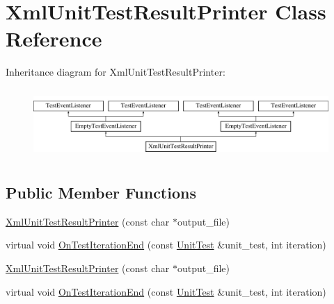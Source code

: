 \hypertarget{classtesting_1_1internal_1_1XmlUnitTestResultPrinter}{\section{\-Xml\-Unit\-Test\-Result\-Printer \-Class \-Reference}
\label{d6/de5/classtesting_1_1internal_1_1XmlUnitTestResultPrinter}
}
\-Inheritance diagram for \-Xml\-Unit\-Test\-Result\-Printer\-:\begin{figure}[H]
\begin{center}
\leavevmode
\includegraphics[height=2.675159cm]{d6/de5/classtesting_1_1internal_1_1XmlUnitTestResultPrinter}
\end{center}
\end{figure}
\subsection*{\-Public \-Member \-Functions}
\begin{DoxyCompactItemize}
\item 
\hyperlink{classtesting_1_1internal_1_1XmlUnitTestResultPrinter_a7bfec56d4e2ab7d80f3f0fde70fbf255}{\-Xml\-Unit\-Test\-Result\-Printer} (const char $\ast$output\-\_\-file)
\item 
virtual void \hyperlink{classtesting_1_1internal_1_1XmlUnitTestResultPrinter_aa21b349a51378e47877ee6d153c37116}{\-On\-Test\-Iteration\-End} (const \hyperlink{classtesting_1_1UnitTest}{\-Unit\-Test} \&unit\-\_\-test, int iteration)
\item 
\hyperlink{classtesting_1_1internal_1_1XmlUnitTestResultPrinter_a7bfec56d4e2ab7d80f3f0fde70fbf255}{\-Xml\-Unit\-Test\-Result\-Printer} (const char $\ast$output\-\_\-file)
\item 
virtual void \hyperlink{classtesting_1_1internal_1_1XmlUnitTestResultPrinter_a736a6086d1aca9c9d63810d73ea1ef0e}{\-On\-Test\-Iteration\-End} (const \hyperlink{classtesting_1_1UnitTest}{\-Unit\-Test} \&unit\-\_\-test, int iteration)
\end{DoxyCompactItemize}
